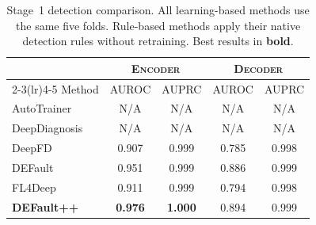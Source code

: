 \begin{table}[!htbp]
\centering
\caption{Stage~1 detection comparison. All learning-based methods use the same five folds. Rule-based methods apply their native detection rules without retraining. Best results in \textbf{bold}.}
\label{tab:baseline_detection}
\small
\setlength{\tabcolsep}{3.5pt}
\begin{tabular}{l cc cc}
\toprule
& \multicolumn{2}{c}{\textsc{Encoder}} & \multicolumn{2}{c}{\textsc{Decoder}} \\
\cmidrule(lr){2-3}\cmidrule(lr){4-5}
Method & AUROC & AUPRC & AUROC & AUPRC \\
\midrule
AutoTrainer~\cite{autotrainer} & N/A & N/A & N/A & N/A \\
DeepDiagnosis~\cite{deepdiagnosis} & N/A & N/A & N/A & N/A \\
DeepFD~\cite{deepfd} & 0.907 & 0.999 & 0.785 & 0.998 \\
DEFault~\cite{default} & 0.951 & 0.999 & 0.886 & 0.999 \\
FL4Deep~\cite{fl4deep} & 0.911 & 0.999 & 0.794 & 0.998 \\
\midrule
\textbf{DEFault++} & \textbf{0.976} & \textbf{1.000} & 0.894 & 0.999 \\
\bottomrule
\end{tabular}
\end{table}

